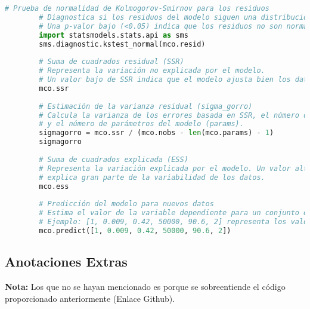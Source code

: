 \documentclass[a4paper,12pt]{article}
\begin{document}
    \begin{lstlisting}[language=Python, style=custompython, caption={Pruebas estadísticas, estimación de varianza residual, suma de cuadrados y predicción del modelo.}]
        # Prueba de normalidad de Kolmogorov-Smirnov para los residuos
        # Diagnostica si los residuos del modelo siguen una distribución normal.
        # Una p-valor bajo (<0.05) indica que los residuos no son normales.
        import statsmodels.stats.api as sms
        sms.diagnostic.kstest_normal(mco.resid)
        
        # Suma de cuadrados residual (SSR)
        # Representa la variación no explicada por el modelo.
        # Un valor bajo de SSR indica que el modelo ajusta bien los datos.
        mco.ssr
        
        # Estimación de la varianza residual (sigma_gorro)
        # Calcula la varianza de los errores basada en SSR, el número de observaciones (nobs),
        # y el número de parámetros del modelo (params).
        sigmagorro = mco.ssr / (mco.nobs - len(mco.params) - 1)
        sigmagorro
        
        # Suma de cuadrados explicada (ESS)
        # Representa la variación explicada por el modelo. Un valor alto indica que el modelo
        # explica gran parte de la variabilidad de los datos.
        mco.ess
        
        # Predicción del modelo para nuevos datos
        # Estima el valor de la variable dependiente para un conjunto específico de predictores.
        # Ejemplo: [1, 0.009, 0.42, 50000, 90.6, 2] representa los valores de las variables independientes.
        mco.predict([1, 0.009, 0.42, 50000, 90.6, 2])
\end{lstlisting}

\subsection{Anotaciones Extras}

\begin{tcolorbox}[colback=blue!5!white,colframe=blue!75!black, title=Recursos de Prácticas en Econometría con Python]
    \textbf{Nota:} Los que no se hayan mencionado es porque se sobreentiende el código proporcionado anteriormente (Enlace Github).
    
\end{tcolorbox}
        
    
    
    
    
    
        
\end{document}
